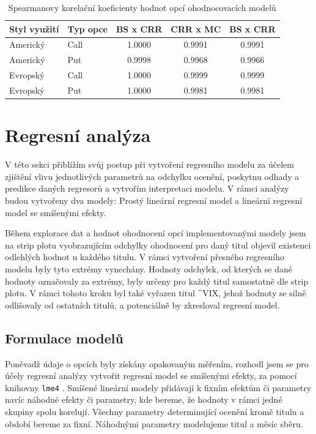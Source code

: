 \documentclass[male,czech,api_bc]{kitheses}
\begin{document}
  \begin{table}[h!]
    \centering
    \caption{Spearmanovy korelační koeficienty hodnot opcí ohodnocovacích modelů}
    \label{tab:spearman}
    \begin{tabular}{llccc}
      \toprule
      Styl využití  & Typ opce  & BS x CRR  & CRR x MC  & BS x CRR \\
      \midrule
      Americký  & Call  & 1.0000  & 0.9991  & 0.9991 \\
      Americký  & Put   & 0.9998  & 0.9968  & 0.9966 \\
      Evropský  & Call  & 1.0000  & 0.9999  & 0.9999 \\
      Evropský  & Put   & 1.0000  & 0.9981  & 0.9981 \\
      \bottomrule
    \end{tabular}
  \end{table}


  \section{Regresní analýza}
 
  V této sekci přiblížím svůj postup při vytvoření regresního modelu za účelem zjištění vlivu jednotlivých parametrů na odchylku ocenění, poskytnu odhady a predikce daných regresorů a vytvořím interpretaci modelu. V rámci analýzy budou vytvořeny dva modely: Prostý lineární regresní model a lineární regresní model se smíšenými efekty.

    Během explorace dat a hodnot ohodnocení opcí implementovanými modely jsem na strip plotu vyobrazujícím odchylky ohodnocení pro daný titul objevil existenci odlehlých hodnot u každého titulu. V rámci vytvoření přesného regresního modelu byly tyto extrémy vynechány. Hodnoty odchylek, od kterých se dané hodnoty označovaly za extrémy, byly určeny pro každý titul samostatně dle strip plotu. V rámci tohoto kroku byl také vyřazen titul \textasciicircum{}VIX, jehož hodnoty se silně odlišovaly od ostatních titulů, a potenciálně by zkresloval regresní model.

  \subsection{Formulace modelů}

  Poněvadž údaje o opcích byly získány opakovaným měřením, rozhodl jsem se pro účely regresní analýzy vytvořit regresní model se smíšenými efekty, za pomocí knihovny \texttt{lme4} \parencites{LME4}. Smíšené lineární modely přidávají k fixním efektům či parametry navíc náhodné efekty či parametry, kde bereme, že hodnoty v rámci jedné skupiny spolu korelují. Všechny parametry determinující ocenění kromě titulu a období bereme za fixní. Náhodnými parametry modelujeme titul a měsíc sběru.
\end{document}
